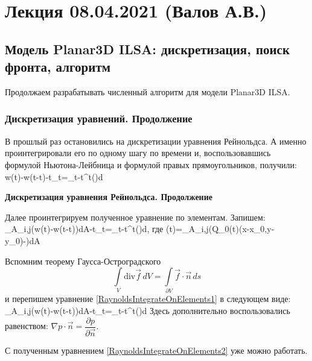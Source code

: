 \documentclass[main.tex]{subfiles}
\begin{document}

\section{Лекция 08.04.2021 (Валов А.В.)}

\subsection{Модель Planar3D ILSA: дискретизация, поиск фронта, алгоритм}

Продолжаем разрабатывать численный алгоритм для модели Planar3D ILSA.

\subsubsection{Дискретизация уравнений. Продолжение}

В прошлый раз остановились на дискретизации уравнения Рейнольдса.
А именно проинтегрировали его по одному шагу по времени и, воспользовавшись формулой Ньютона-Лейбница и формулой правых прямоугольников, получили:
\beq
w(t)-w(t-\Delta t)-\Delta t_t=\int\limits_{t-\Delta t}^{t}{\varphi(\tau)d\tau}
\eeq


\textbf{Дискретизация уравнения Рейнольдса. Продолжение}

Далее проинтегрируем полученное уравнение по элементам.
Запишем:
\beq\label{RaynoldsIntegrateOnElements1}
\int\limits_{A_{i,j}}{\left(w(t)-w(t-\Delta t)\right)dA}-\Delta t_t=\int\limits_{t-\Delta t}^{t}{\psi(\tau)d\tau},
\eeq
где
\beq
\psi(t)=\int\limits_{A_{i,j}}{\left(Q_0(t)\delta(x-x_0,y-y_0)-\right)dA}
\eeq

Вспомним теорему Гаусса-Остроградского
$$\int\limits_{V}\text{div}\vec{f}\,dV=\int\limits_{\partial V}\vec{f}\cdot\vec{n}\,ds$$
и перепишем уравнение \eqref{RaynoldsIntegrateOnElements1} в следующем виде:
\beq\label{RaynoldsIntegrateOnElements2}
\int\limits_{A_{i,j}}{\left(w(t)-w(t-\Delta t)\right)dA}-\Delta t_t=\int\limits_{t-\Delta t}^{t}{\psi(\tau)d\tau}
\eeq
Здесь дополнительно воспользовались равенством: $\nabla p\cdot\vec{n}=\dfrac{\partial p}{\partial\vec{n}}$.

С полученным уравнением \eqref{RaynoldsIntegrateOnElements2} уже можно работать.
\end{document}
